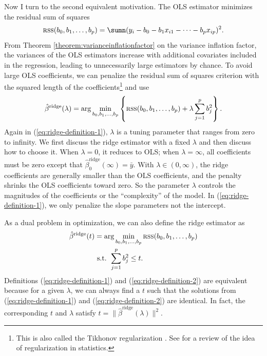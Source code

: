 Now I turn to the second equivalent motivation. The 
OLS estimator minimizes the residual sum of squares 
$$
\textsc{rss}(b_0,b_1,\ldots,b_p) = 
\sumn(y_{i}-b_{0}-b_{1}x_{i1}-\cdots-b_{p}x_{ip})^{2}.
$$
From Theorem \ref{theorem:varianceinflationfactor} on the variance inflation factor, the variances of the OLS
estimators increase with additional covariates included in the regression,
leading to unnecessarily large estimators by chance. To avoid large OLS coefficients,
we can penalize the residual sum of squares criterion with the squared length of the coefficients\footnote{This is also called the Tikhonov regularization \citep{tikhonov1943stability}. See \citet{bickel2006regularization} for a review of the idea of regularization in statistics.}  
and use
\begin{equation}
\hat{\beta}^{\text{ridge}}(\lambda)=\arg\min_{b_{0},b_{1},\ldots,b_{p}}\left\{ \textsc{rss}(b_0,b_1,\ldots,b_p)+\lambda\sum_{j=1}^{p}b_{j}^{2}\right\} .\label{eq:ridge-definition-1}
\end{equation}
Again in (\ref{eq:ridge-definition-1}), $\lambda $ is a tuning parameter
that ranges from zero to infinity. We first discuss the ridge estimator
with a fixed $\lambda$ and then discuss how to choose it. When $\lambda=0$,
it reduces to OLS; when $\lambda=\infty$, all coefficients must be
zero except that $\hat{\beta}_{0}^{\text{ridge}}(\infty)=\bar{y}$.
With $\lambda \in (0,\infty)$, the ridge coefficients are generally
smaller than the OLS coefficients, and the penalty shrinks the OLS
coefficients toward zero. So the parameter $\lambda$ controls the
magnitudes of the coefficients or the ``complexity'' of the model.
In (\ref{eq:ridge-definition-1}), we only penalize the slope parameters
not the intercept. 


As a dual problem in optimization, we can also
define the ridge estimator as
\begin{align}
\hat{\beta}^{\text{ridge}}(t) & =\arg\min_{b_{0},b_{1},\ldots,b_{p}} \textsc{rss}(b_0,b_1,\ldots,b_p) \nonumber \\
 & \ \textup{s.t. }\sum_{j=1}^{p}b_{j}^{2}\leq t.\label{eq:ridge-definition-2}
\end{align}
Definitions (\ref{eq:ridge-definition-1}) and (\ref{eq:ridge-definition-2})
are equivalent because for a given $\lambda$, we can always find
a $t$ such that the solutions from (\ref{eq:ridge-definition-1})
and (\ref{eq:ridge-definition-2}) are identical. In fact, the corresponding $t$ and $\lambda$ satisfy $t = \|  \hat{\beta}^{\text{ridge}} (\lambda)  \|^2 .$

